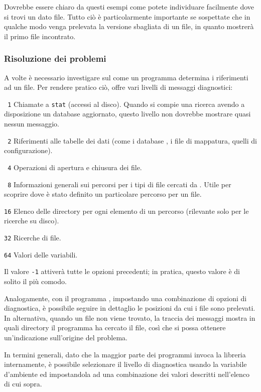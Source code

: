 \documentclass{article}
\begin{document}
Dovrebbe essere chiaro da questi esempi come potete individuare facilmente
dove si trovi un dato file. Tutto ciò è particolarmente importante se
sospettate che in qualche modo venga prelevata la versione sbagliata di un
file, in quanto  mostrerà il primo file incontrato.

\subsubsection{Risoluzione dei problemi}
\label{sec:debugging}

A volte è necessario investigare sul come un programma determina i
riferimenti ad un file. Per rendere pratico ciò, \KPS{} offre vari livelli
di messaggi diagnostici:

\begin{ttdescription}
\item[\texttt{\ 1}] Chiamate a \texttt{stat} (accessi al disco). Quando si
  compie una ricerca avendo a disposizione un database 
  aggiornato, questo livello non dovrebbe mostrare quasi nessun messaggio.
\item[\texttt{\ 2}] Riferimenti alle tabelle dei dati (come i database
  , i file di mappatura, quelli di configurazione).
\item[\texttt{\ 4}] Operazioni di apertura e chiusura dei file.
\item[\texttt{\ 8}] Informazioni generali sui percorsi per i tipi di file
  cercati da \KPS. Utile per scoprire dove è stato definito un particolare
  percorso per un file.
\item[\texttt{16}] Elenco delle directory per ogni elemento di un percorso
  (rilevante solo per le ricerche su disco).
\item[\texttt{32}] Ricerche di file.
\item[\texttt{64}] Valori delle variabili.
\end{ttdescription}
Il valore \texttt{-1} attiverà tutte le opzioni precedenti; in
pratica, questo valore è di solito il più comodo.

Analogamente, con il programma , impostando una
combinazione di opzioni di diagnostica, è possibile seguire in dettaglio
le posizioni da cui i file sono prelevati. In alternativa, quando un file
non viene trovato, la traccia dei messaggi mostra in quali directory il
programma ha cercato il file, così che si possa ottenere un'indicazione
sull'origine del problema.

In termini generali, dato che la maggior parte dei programmi invoca la
libreria \KPS{} internamente, è possibile selezionare il livello di
diagnostica usando la variabile d'ambiente  ed
impostandola ad una combinazione dei valori descritti nell'elenco di cui
sopra.
\end{document}
